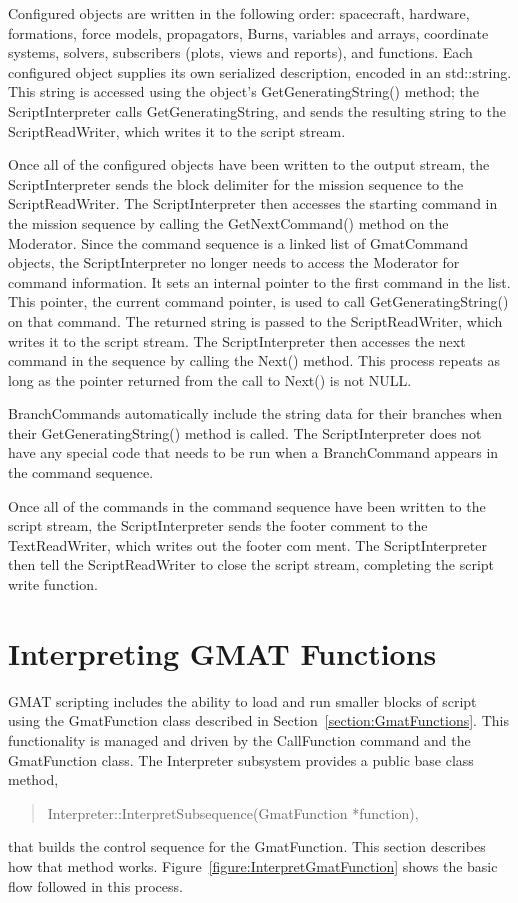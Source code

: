 Configured objects are written in the following order: spacecraft, hardware, formations, force
models, propagators, Burns, variables and arrays, coordinate systems, solvers, subscribers (plots,
views and reports), and functions.  Each configured object supplies its own serialized description,
encoded in an std::string.  This string is accessed using the object's GetGeneratingString()
method; the ScriptInterpreter calls GetGeneratingString, and sends the resulting string to the
ScriptReadWriter, which writes it to the script stream.

Once all of the configured objects have been written to the output stream, the ScriptInterpreter
sends the block delimiter for the mission sequence to the ScriptReadWriter.  The ScriptInterpreter
then accesses the starting command in the mission sequence by calling the GetNextCommand() method
on the Moderator.  Since the command sequence is a linked list of GmatCommand objects, the
ScriptInterpreter no longer needs to access the Moderator for command information.  It sets an
internal pointer to the first command in the list.  This pointer, the current command pointer,
is used to call GetGeneratingString() on that command.  The returned string is passed to the
ScriptReadWriter, which writes it to the script stream.  The ScriptInterpreter then accesses the
next command in the sequence by calling the Next() method.  This process repeats as long as the
pointer returned from the call to Next() is not NULL.

BranchCommands automatically include the string data for their branches when their
GetGeneratingString() method is called.  The ScriptInterpreter does not have any special code that
needs to be run when a BranchCommand appears in the command sequence.

Once all of the commands in the command sequence have been written to the script stream, the
ScriptInterpreter sends the footer comment to the TextReadWriter, which writes out the footer com
ment.  The ScriptInterpreter then tell the ScriptReadWriter to close the script stream, completing
the script write function.


\section{\label{section:InterpretingGmatFunctions}Interpreting GMAT Functions}

GMAT scripting includes the ability to load and run smaller blocks of script using the GmatFunction
class described in Section~\ref{section:GmatFunctions}.  This functionality is managed and driven
by the CallFunction command and the GmatFunction class.  The Interpreter subsystem provides a
public base class method,
\begin{quote}
Interpreter::InterpretSubsequence(GmatFunction *function),
\end{quote}
\noindent that builds the control sequence for the GmatFunction.  This section describes how that
method works.  Figure~\ref{figure:InterpretGmatFunction} shows the basic flow followed in this
process.

